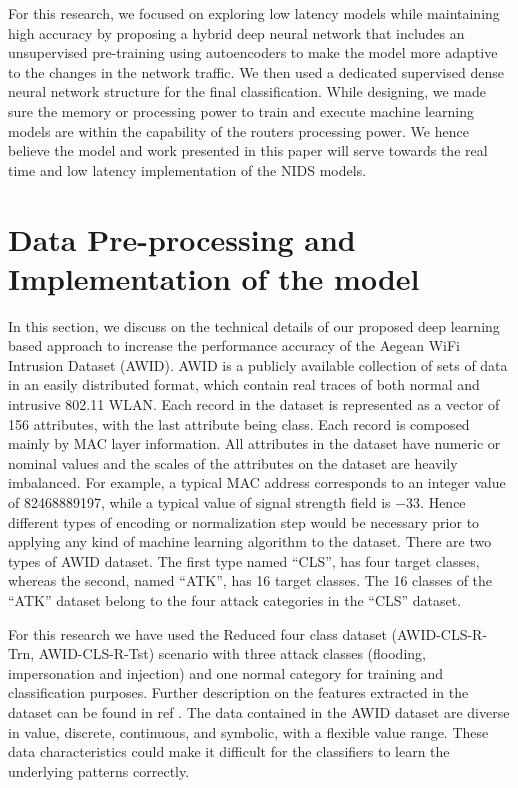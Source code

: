 \documentclass[letterpaper, 10pt, conference]{ieeeconf} %
\begin{document}
For this research, we focused on exploring low latency models while maintaining high accuracy by proposing a hybrid deep neural network that includes an unsupervised pre-training using autoencoders to make the model more adaptive to the changes in the network traffic. We then used a dedicated supervised dense neural network structure for the final classification. While designing, we made sure the memory or processing power to train and execute machine learning models are within the capability of the routers processing power. We hence believe the model and work presented in this paper will serve towards the real time and low latency implementation of the NIDS models.

\section{Data Pre-processing and Implementation of the model}
In this section, we discuss on the technical details of our proposed deep learning based approach to increase the performance accuracy of the Aegean WiFi Intrusion Dataset (AWID). AWID is a publicly available collection of sets of data in an easily distributed format, which contain real traces of both normal and intrusive 802.11 WLAN\cite{AWID_main}. Each record in the dataset is represented as a vector of 156 attributes, with the last attribute being class. Each record is composed mainly by MAC layer information.
All attributes in the dataset have numeric or nominal values and the scales of the attributes on the dataset are heavily imbalanced. For example, a typical MAC address corresponds to an integer value of 82468889197, while a typical value of signal strength field is −33. Hence different types of encoding or normalization step would be necessary prior to applying any kind of machine learning algorithm to the dataset.
There are two types of AWID dataset. The first type named “CLS”, has four target classes, whereas the second, named “ATK”, has 16 target classes. The 16 classes of the “ATK” dataset belong to the four attack categories in the “CLS” dataset.

For this research we have used the Reduced four class dataset (AWID-CLS-R-Trn, AWID-CLS-R-Tst) scenario with three attack classes (flooding, impersonation and injection) and one normal category for training and classification purposes. Further description on the features extracted in the dataset can be found in ref \cite{AWID_main, AWID}. The data contained in the AWID dataset are diverse in value, discrete, continuous, and symbolic, with a flexible value range. These data characteristics could make it difficult for the classifiers to learn the underlying patterns correctly.
\end{document}
